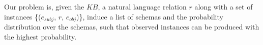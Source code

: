 %


Our problem is, given the $KB$, a natural language relation $r$ along with a set of
instances \{($e_{subj}$, $r$, $e_{obj}$)\}, induce a list of schemas and 
the probability distribution over the schemas, such that observed instances
can be produced with the highest probability.




